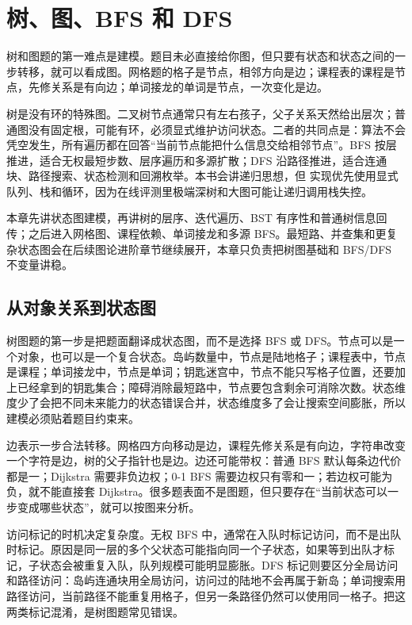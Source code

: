 \chapter{树、图、BFS 和 DFS}

树和图题的第一难点是建模。题目未必直接给你图，但只要有状态和状态之间的一步转移，就可以看成图。网格题的格子是节点，相邻方向是边；课程表的课程是节点，先修关系是有向边；单词接龙的单词是节点，一次变化是边。

树是没有环的特殊图。二叉树节点通常只有左右孩子，父子关系天然给出层次；普通图没有固定根，可能有环，必须显式维护访问状态。二者的共同点是：算法不会凭空发生，所有遍历都在回答“当前节点能把什么信息交给相邻节点”。BFS 按层推进，适合无权最短步数、层序遍历和多源扩散；DFS 沿路径推进，适合连通块、路径搜索、状态检测和回溯枚举。本书会讲递归思想，但 \cpp 实现优先使用显式队列、栈和循环，因为在线评测里极端深树和大图可能让递归调用栈失控。

本章先讲状态图建模，再讲树的层序、迭代遍历、BST 有序性和普通树信息回传；之后进入网格图、课程依赖、单词接龙和多源 BFS。最短路、并查集和更复杂状态图会在后续图论进阶章节继续展开，本章只负责把树图基础和 BFS/DFS 不变量讲稳。

\section{从对象关系到状态图}

树图题的第一步是把题面翻译成状态图，而不是选择 BFS 或 DFS。节点可以是一个对象，也可以是一个复合状态。岛屿数量中，节点是陆地格子；课程表中，节点是课程；单词接龙中，节点是单词；钥匙迷宫中，节点不能只写格子位置，还要加上已经拿到的钥匙集合；障碍消除最短路中，节点要包含剩余可消除次数。状态维度少了会把不同未来能力的状态错误合并，状态维度多了会让搜索空间膨胀，所以建模必须贴着题目约束来。

边表示一步合法转移。网格四方向移动是边，课程先修关系是有向边，字符串改变一个字符是边，树的父子指针也是边。边还可能带权：普通 BFS 默认每条边代价都是一；Dijkstra 需要非负边权；0-1 BFS 需要边权只有零和一；若边权可能为负，就不能直接套 Dijkstra。很多题表面不是图题，但只要存在“当前状态可以一步变成哪些状态”，就可以按图来分析。

访问标记的时机决定复杂度。无权 BFS 中，通常在入队时标记访问，而不是出队时标记。原因是同一层的多个父状态可能指向同一个子状态，如果等到出队才标记，子状态会被重复入队，队列规模可能明显膨胀。DFS 标记则要区分全局访问和路径访问：岛屿连通块用全局访问，访问过的陆地不会再属于新岛；单词搜索用路径访问，当前路径不能重复用格子，但另一条路径仍然可以使用同一格子。把这两类标记混淆，是树图题常见错误。


